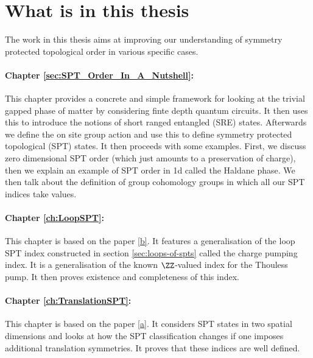 \section{What is in this thesis}
The work in this thesis aims at improving our understanding of symmetry protected topological order in various specific cases.
\paragraph{Chapter \ref{sec:SPT_Order_In_A_Nutshell}:}This chapter provides a concrete and simple framework for looking at the trivial gapped phase of matter by considering finte depth quantum circuits. It then uses this to introduce the notions of short ranged entangled (SRE) states. Afterwards we define the on site group action and use this to define symmetry protected topological (SPT) states. It then proceeds with some examples. First, we discuss zero dimensional SPT order (which just amounts to a preservation of charge), then we explain an example of SPT order in 1d called the Haldane phase. We then talk about the definition of group cohomology groups in which all our SPT indices take values.
\paragraph{Chapter \ref{ch:LoopSPT}:}This chapter is based on the paper \hyperref[mySecondPaper]{[b]}. It features a generalisation of the loop SPT index constructed in section \ref{sec:loops-of-spts} called the charge pumping index. It is a generalisation of the known $\ZZ$-valued index for the Thouless pump. It then proves existence and completeness of this index.
\paragraph{Chapter \ref{ch:TranslationSPT}:}This chapter is based on the paper \hyperref[myFirstPaper]{[a]}. It considers SPT states in two spatial dimensions and looks at how the SPT classification changes if one imposes additional translation symmetries. It proves that these indices are well defined.

\cleardoublepage

